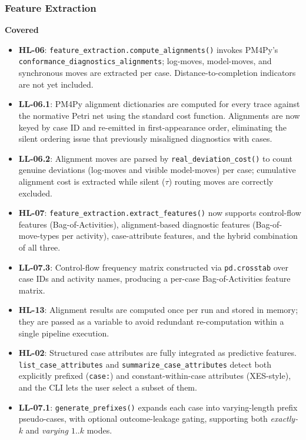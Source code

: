 \documentclass[12pt,a4paper]{article}
\begin{document}
\subsubsection{Feature Extraction}

\textbf{Covered}
\begin{itemize}
    \item \textbf{HL-06}: \texttt{feature\_extraction.compute\_alignments()} invokes PM4Py's \\\texttt{conformance\_diagnostics\_alignments}; log-moves, model-moves, and synchronous moves are extracted per case. Distance-to-completion indicators are not yet included.
    \item \textbf{LL-06.1}: PM4Py alignment dictionaries are computed for every trace against the normative Petri net using the standard cost function. Alignments are now keyed by case ID and re-emitted in first-appearance order, eliminating the silent ordering issue that previously misaligned diagnostics with cases.
    \item \textbf{LL-06.2}: Alignment moves are parsed by \texttt{real\_deviation\_cost()} to count genuine deviations (log-moves and visible model-moves) per case; cumulative alignment cost is extracted while silent ($\tau$) routing moves are correctly excluded.
    \item \textbf{HL-07}: \texttt{feature\_extraction.extract\_features()} now supports control-flow features (Bag-of-Activities), alignment-based diagnostic features (Bag-of-move-types per activity), case-attribute features, and the hybrid combination of all three.
    \item \textbf{LL-07.3}: Control-flow frequency matrix constructed via \texttt{pd.crosstab} over case IDs and activity names, producing a per-case Bag-of-Activities feature matrix.
    \item \textbf{HL-13}: Alignment results are computed once per run and stored in memory; they are passed as a variable to avoid redundant re-computation within a single pipeline execution.
    \item \textbf{HL-02}: Structured case attributes are fully integrated as predictive features. \texttt{list\_case\_attributes} and \texttt{summarize\_case\_attributes} detect both explicitly prefixed (\texttt{case:}) and constant-within-case attributes (XES-style), and the CLI lets the user select a subset of them.
    \item \textbf{LL-07.1}: \texttt{generate\_prefixes()} expands each case into varying-length prefix pseudo-cases, with optional outcome-leakage gating, supporting both \textit{exactly-$k$} and \textit{varying $1..k$} modes.

\end{itemize}
\end{document}
